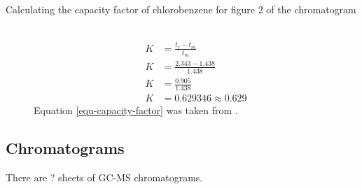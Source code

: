 \documentclass[a4paper, 12pt]{article}
\begin{document}
\begin{description}
	\item[Calculating the capacity factor of chlorobenzene for figure 2 of the chromatogram] \hfill \\
		\begin{equation} \label{equ-capacity-factor}
			\begin{split}
				K & = \frac{t_r - t_m}{t_m} \\
				K & = \frac{2.343 - 1.438}{1.438} \\
				K & = \frac{0.905}{1.438} \\
				K & = 0.629346 \approx 0.629
			\end{split}
		\end{equation}
		Equation \ref{equ-capacity-factor} was taken from \cite{harris}.
\end{description}

\subsection{Chromatograms}
There are ? sheets of GC-MS chromatograms.

\end{document}
